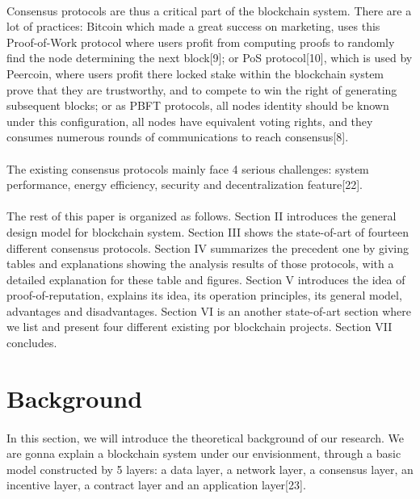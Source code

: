 \documentclass[doublespacing]{bmcart}
\begin{document}
\begin{CJK*}{UTF8}{gbsn}
\paragraph{}
	Consensus protocols are thus a critical part of the blockchain system. There are a lot of practices: Bitcoin which made a great success on marketing, uses this Proof-of-Work protocol where users profit from computing proofs to randomly find the node determining the next block[9]; or PoS protocol[10], which is used by Peercoin, where users profit there locked stake within the blockchain system prove that they are trustworthy, and to compete to win the right of generating subsequent blocks; or as PBFT protocols, all nodes identity should be known under this configuration, all nodes have equivalent voting rights, and they consumes numerous rounds of communications to reach consensus[8].
	\paragraph{} 
	The existing consensus protocols mainly face 4 serious challenges: system performance, energy efficiency, security and decentralization feature[22].
\paragraph{} The rest of this paper is organized as follows. Section II introduces the general design model for blockchain system. Section III shows the state-of-art of fourteen different consensus protocols. Section IV summarizes the precedent one by giving tables and explanations showing the analysis results of those protocols, with a detailed explanation for these table and figures. Section V introduces the idea of proof-of-reputation, explains its idea, its operation principles, its general model, advantages and disadvantages. Section VI is an another state-of-art section where we list and present four different existing por blockchain projects. %
 Section VII concludes.
\section{Background}
\paragraph{}
	In this section, we will introduce the theoretical background of our research. We are gonna explain a blockchain system under our envisionment, through a basic model constructed by 5 layers: a data layer, a network layer, a consensus layer, an incentive layer, a contract layer and an application layer[23].

\end{CJK*}
\end{document}
